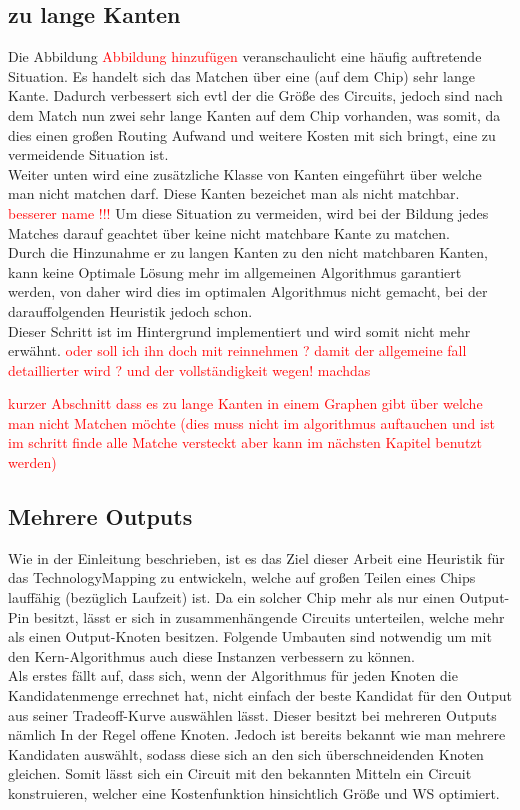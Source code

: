 \documentclass[11pt, a4paper, german]{article}
\newcommand{\TM}{TechnologyMapping }
\begin{document}
\subsection{zu lange Kanten}
Die Abbildung \textcolor{red}{Abbildung hinzufügen} veranschaulicht eine häufig auftretende Situation. Es handelt sich das Matchen über eine (auf dem Chip) sehr lange Kante. Dadurch verbessert sich evtl der die Größe des Circuits, jedoch sind nach dem Match nun zwei sehr lange Kanten auf dem Chip vorhanden, was somit, da dies einen großen Routing Aufwand und weitere Kosten mit sich bringt, eine zu vermeidende Situation ist. \\
Weiter unten wird eine zusätzliche Klasse von Kanten eingeführt über welche man nicht matchen darf.
Diese Kanten bezeichet man als nicht matchbar. \textcolor{red}{besserer name !!!}
Um diese Situation zu vermeiden, wird bei der Bildung jedes Matches darauf geachtet über keine nicht matchbare Kante zu matchen.\\
Durch die Hinzunahme er zu langen Kanten zu den nicht matchbaren Kanten, kann keine Optimale Lösung mehr im allgemeinen Algorithmus garantiert werden, von daher wird dies im optimalen Algorithmus nicht gemacht, bei der darauffolgenden Heuristik jedoch schon. \\
Dieser Schritt ist im Hintergrund implementiert und wird somit nicht mehr erwähnt.
\textcolor{red}{oder soll ich ihn doch mit reinnehmen ? damit der allgemeine fall detaillierter wird ? und der vollständigkeit wegen! machdas  }


\textcolor{red}{kurzer Abschnitt dass es zu lange Kanten in einem Graphen gibt über welche man nicht Matchen möchte (dies muss nicht im algorithmus auftauchen und ist im schritt finde alle Matche versteckt aber kann im nächsten Kapitel benutzt werden)}

\subsection{Mehrere Outputs}
Wie in der Einleitung beschrieben, ist es das Ziel dieser Arbeit eine Heuristik für das \TM zu entwickeln, welche auf großen Teilen eines Chips lauffähig (bezüglich Laufzeit) ist. Da ein solcher Chip mehr als nur einen Output-Pin besitzt, lässt er sich in zusammenhängende Circuits unterteilen, welche mehr als einen Output-Knoten besitzen. Folgende Umbauten sind notwendig um mit den Kern-Algorithmus auch diese Instanzen verbessern zu können.\\

Als erstes fällt auf, dass sich, wenn der Algorithmus für jeden Knoten die Kandidatenmenge errechnet hat, nicht einfach der beste Kandidat für den Output aus seiner Tradeoff-Kurve auswählen lässt. Dieser besitzt bei mehreren Outputs nämlich In der Regel offene Knoten. 
Jedoch ist bereits bekannt wie man mehrere Kandidaten auswählt, sodass diese sich an den sich überschneidenden Knoten gleichen. Somit lässt sich ein Circuit mit den bekannten Mitteln ein Circuit konstruieren, welcher eine Kostenfunktion hinsichtlich Größe und WS optimiert. \\
\end{document}
